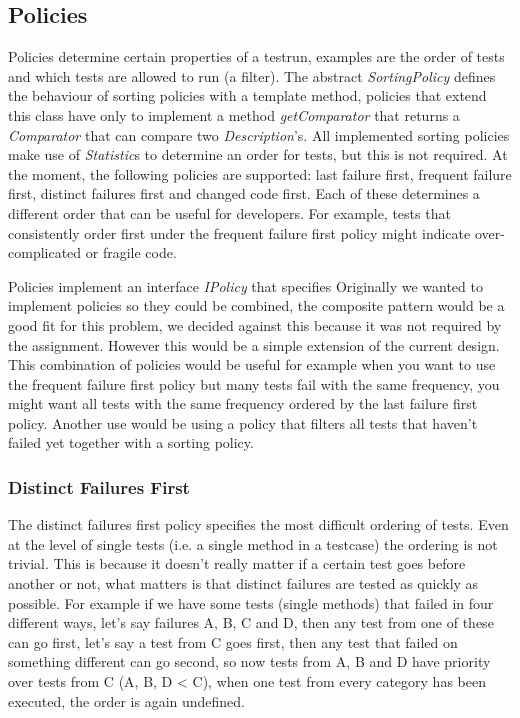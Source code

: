 \documentclass[i2]{oss}
\newcommand{\class}[1]{\emph{#1}}
\newcommand{\method}[1]{\emph{#1}}
\begin{document}

\subsection{Policies}
\label{subssec: Policies}

Policies determine certain properties of a testrun, examples are
the order of tests and which tests are allowed to run (a filter).
The abstract \class{SortingPolicy} defines the behaviour of sorting
policies with a template method, policies that extend this class have
only to implement a method \method{getComparator} that returns a 
\class{Comparator} that can compare two \class{Description}'s.
All implemented sorting policies make use of \class{Statistic}s to 
determine an order for tests, but this is not required.
At the moment, the following policies are supported: last failure first, 
frequent failure first, distinct failures first and changed code  first.
Each of these determines a different order that can be useful for
developers.
For example, tests that consistently order first under the frequent
failure first policy might indicate over-complicated or fragile code.

Policies implement an interface \class{IPolicy} that specifies
Originally we wanted to implement policies so they could be combined,
the composite pattern would be a good fit for this problem,
we decided against this because it was not required by the assignment.
However this would be a simple extension of the current design.
This combination of policies would be useful for example when you want
to use the frequent failure first policy but many tests fail with the
same frequency, you might want all tests with the same frequency ordered
by the last failure first policy.
Another use would be using a policy that filters all tests that haven't
failed yet together with a sorting policy.

\subsubsection{Distinct Failures First}

The distinct failures first policy specifies the most difficult 
ordering of tests.
Even at the level of single tests (i.e. a single method in a testcase)
the ordering is not trivial.
This is because it doesn't really matter if a certain test goes before 
another or not, what matters is that distinct failures are tested as 
quickly as possible.
For example if we have some tests (single methods) that failed in four
different ways, let's say failures A, B, C and D, then any test from 
one of these can go first, let's say a test from C goes first, then 
any test that failed on something different can go second, so now 
tests from A, B and D have priority over tests from C (A, B, D < C), 
when one test from every category has been executed, the order is again 
undefined.
\end{document}
